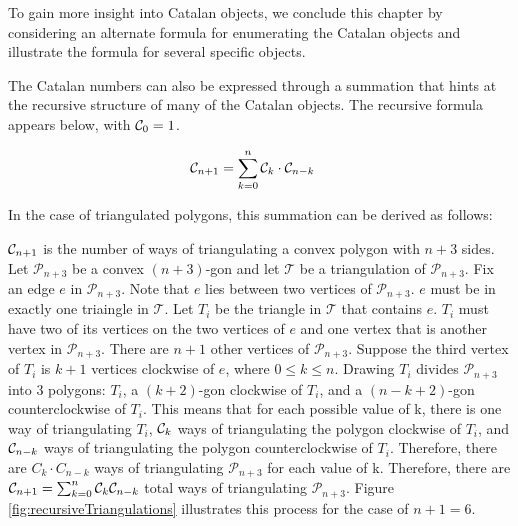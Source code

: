 To gain more insight into Catalan objects, we conclude this chapter by considering an alternate formula for enumerating the Catalan objects and illustrate the formula for several specific objects.

The Catalan numbers can also be expressed through a summation that hints at the recursive structure of many of the Catalan objects.  
The recursive formula appears below, with $\mathcal{C}_0=1$.

\begin{align}
    \mathcal{C}_{n+1} &= \sum_{k=0}^{n}{\mathcal{C}_{k}\cdot\mathcal{C}_{n-k}}
\end{align} 

In the case of triangulated polygons, this summation can be derived as follows:

$\mathcal{C}_{n+1}$ is the number of ways of triangulating a convex polygon with $n+3$ sides.  Let $\mathcal{P}_{n+3}$ be a convex $(n+3)$-gon and let $\mathcal{T}$ be a triangulation of $\mathcal{P}_{n+3}$. Fix an edge $e$ in $\mathcal{P}_{n+3}$.  Note that $e$ lies between two vertices of $\mathcal{P}_{n+3}$. $e$ must be in exactly one triaingle in $\mathcal{T}$.  Let $T_{i}$ be the triangle in $\mathcal{T}$ that contains $e$.  $T_{i}$ must have two of its vertices on the two vertices of $e$ and one vertex that is another vertex in $\mathcal{P}_{n+3}$.  There are $n+1$ other vertices of $\mathcal{P}_{n+3}$.  Suppose the third vertex of $T_i$ is $k+1$ vertices clockwise of $e$, where $0\le k \le n$. Drawing $T_i$ divides $\mathcal{P}_{n+3}$ into 3 polygons: $T_i$, a $(k+2)$-gon clockwise of $T_i$, and a $(n-k+2)$-gon counterclockwise of $T_i$. This means that for each possible value of k, there is one way of triangulating $T_i$, $\mathcal{C}_k$ ways of triangulating the polygon clockwise of $T_i$, and $\mathcal{C}_{n-k}$ ways of triangulating the polygon counterclockwise of $T_i$.  Therefore, there are $C_k\cdot C_{n-k}$ ways of triangulating $\mathcal{P}_{n+3}$ for each value of k.  Therefore, there are $\mathcal{C}_{n+1}=\sum_{k=0}^{n}{\mathcal{C}_{k}\mathcal{C}_{n-k}}$ total ways of triangulating $\mathcal{P}_{n+3}$. Figure \ref{fig:recursiveTriangulations} illustrates this process for the case of $n+1=6$.

